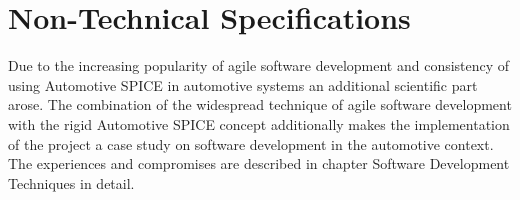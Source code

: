 \section{Non-Technical Specifications}
Due to the increasing popularity of agile software development and consistency of using Automotive SPICE in automotive systems 
an additional scientific part arose. The combination of  the  widespread technique of agile software development with the  rigid Automotive 
SPICE concept additionally makes the implementation of the project a case study on software development in the automotive context. 
The experiences and compromises are described in chapter Software Development Techniques  in detail. 

